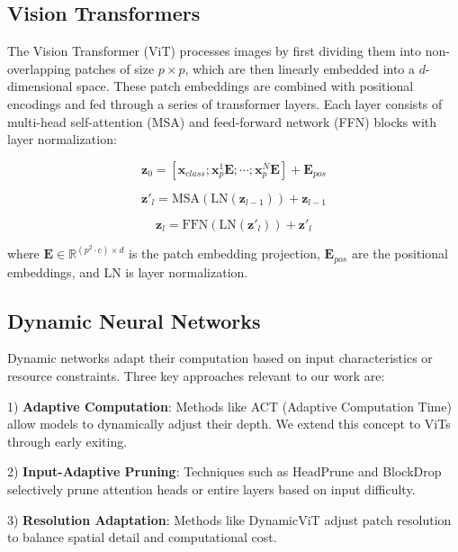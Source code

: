 \documentclass{article}
\begin{document}
\subsection{Vision Transformers}
The Vision Transformer (ViT) processes images by first dividing them into non-overlapping patches of size $p \times p$, which are then linearly embedded into a $d$-dimensional space. These patch embeddings are combined with positional encodings and fed through a series of transformer layers. Each layer consists of multi-head self-attention (MSA) and feed-forward network (FFN) blocks with layer normalization:

\begin{equation}
    \mathbf{z}_0 = [\mathbf{x}_{class}; \mathbf{x}_p^1\mathbf{E}; \cdots; \mathbf{x}_p^N\mathbf{E}] + \mathbf{E}_{pos}
\end{equation}

\begin{equation}
    \mathbf{z}'_l = \text{MSA}(\text{LN}(\mathbf{z}_{l-1})) + \mathbf{z}_{l-1}
\end{equation}

\begin{equation}
    \mathbf{z}_l = \text{FFN}(\text{LN}(\mathbf{z}'_l)) + \mathbf{z}'_l
\end{equation}

where $\mathbf{E} \in \mathbb{R}^{(p^2 \cdot c) \times d}$ is the patch embedding projection, $\mathbf{E}_{pos}$ are the positional embeddings, and LN is layer normalization.

\subsection{Dynamic Neural Networks}
Dynamic networks adapt their computation based on input characteristics or resource constraints. Three key approaches relevant to our work are:

1) \textbf{Adaptive Computation}: Methods like ACT (Adaptive Computation Time) allow models to dynamically adjust their depth. We extend this concept to ViTs through early exiting.

2) \textbf{Input-Adaptive Pruning}: Techniques such as HeadPrune and BlockDrop selectively prune attention heads or entire layers based on input difficulty.

3) \textbf{Resolution Adaptation}: Methods like DynamicViT adjust patch resolution to balance spatial detail and computational cost.
\end{document}
